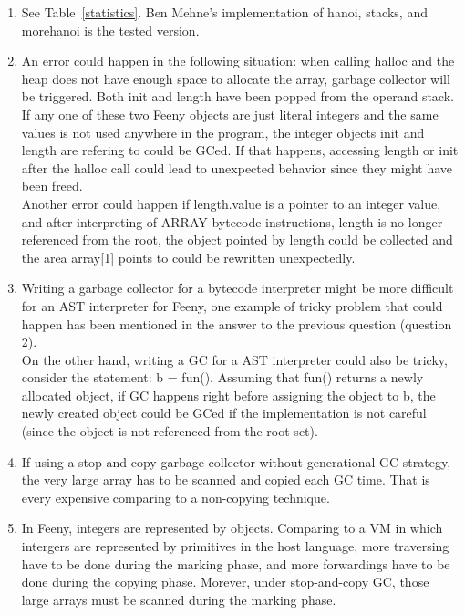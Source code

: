 \documentclass[notitlepage]{report}
\newcommand{\code}[1]{{\ttfamily #1}}
\begin{document}
\begin{enumerate}
	\item
		See Table~\ref{statistics}. Ben Mehne's implementation of hanoi, stacks, and morehanoi is the tested version.
	\item
		An error could happen in the following situation: when calling \code{halloc} and the heap does not have enough space to allocate the array, garbage collector will be triggered. Both \code{init} and \code{length} have been popped from the operand stack. If any one of these two Feeny objects are just literal integers and the same values is not used anywhere in the program, the integer objects \code{init} and \code{length} are refering to could be GCed. If that happens, accessing \code{length} or \code{init} after the \code{halloc} call could lead to unexpected behavior since they might have been freed. \\
		Another error could happen if \code{length.value} is a pointer to an integer value, and after interpreting of \code{ARRAY} bytecode instructions, \code{length} is no longer referenced from the root, the object pointed by \code{length} could be collected and the area \code{array[1]} points to could be rewritten unexpectedly.
	\item
		Writing a garbage collector for a bytecode interpreter might be more difficult for an AST interpreter for Feeny, one example of tricky problem that could happen has been mentioned in the answer to the previous question (question 2). \\
		On the other hand, writing a GC for a AST interpreter could also be tricky, consider the statement: \code{b = fun()}. Assuming that \code{fun()} returns a newly allocated object, if GC happens right before assigning the object to \code{b}, the newly created object could be GCed if the implementation is not careful (since the object is not referenced from the root set). 
	\item 
		If using a stop-and-copy garbage collector without generational GC strategy, the very large array has to be scanned and copied each GC time. That is every expensive comparing to a non-copying technique.
	\item 
		In \code{Feeny}, integers are represented by objects. Comparing to a VM in which intergers are represented by primitives in the host language, more traversing have to be done during the marking phase, and more forwardings have to be done during the copying phase. Morever, under stop-and-copy GC, those large arrays must be scanned during the marking phase.

\end{enumerate}
\end{document}
